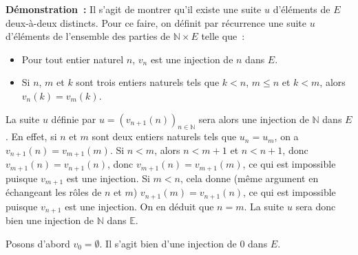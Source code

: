 \noindent\textbf{Démonstration :} Il s'agit de montrer qu'il existe une suite $u$ d'éléments de $E$ deux-à-deux distincts. 
    Pour ce faire, on définit par récurrence une suite $u$ d'éléments de l'ensemble des parties de $\mathbb{N} \times E$ telle que : 
    \begin{itemize}[nosep]
        \item Pour tout entier naturel $n$, $v_n$ est une injection de $n$ dans $E$.
        \item Si $n$, $m$ et $k$ sont trois entiers naturels tels que $k < n$, $m \leq n$ et $k < m$, alors $v_n(k) = v_m(k)$. 
    \end{itemize}
    La suite $u$ définie par $u = \left( v_{n+1}(n) \right)_{n \in \mathbb{N}}$ sera alors une injection de $\mathbb{N}$ dans $E$. 
    En effet, si $n$ et $m$ sont deux entiers naturels tels que $u_n = u_m$, on a $v_{n+1}(n) = v_{m+1}(m)$. 
    Si $n < m$, alors $n < m+1$ et $n < n+1$, donc $v_{m+1}(n) = v_{n+1}(n)$, donc $v_{m+1}(n) = v_{m+1}(m)$, ce qui est impossible puisque $v_{m+1}$ est une injection.
    Si $m < n$, cela donne (même argument en échangeant les rôles de $n$ et $m$) $v_{n+1}(m) = v_{n+1}(n)$, ce qui est impossible puisque $v_{n+1}$ est une injection. 
    On en déduit que $n=m$. 
    La suite $u$ sera donc bien une injection de $\mathbb{N}$ dans $\mathbb{E}$.

    Posons d'abord $v_0 = \emptyset$. 
    Il s'agit bien d'une injection de $0$ dans $E$.

